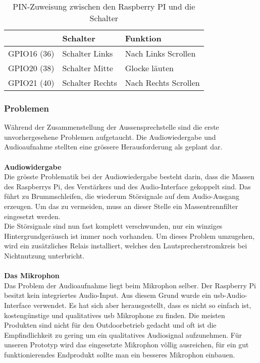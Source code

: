 \begin{table}[]
	\centering
	\label{my-label}
	\begin{tabular}{l|ll}
		\multicolumn{1}{r|}{} \textbf{Pi GPIO (PIN)} & \textbf{Schalter} & \textbf{Funktion} \hspace{60pt}	\\ \hline
		GPIO16 (36)	&	Schalter Links		&	Nach Links Scrollen	\\ \hline
		GPIO20 (38)	&	Schalter Mitte		&	Glocke läuten		\\ \hline
		GPIO21 (40)	&	Schalter Rechts		&	Nach Rechts Scrollen		\\ \hline
	\end{tabular}
	\caption{PIN-Zuweisung zwischen den Raspberry PI und die Schalter}
	\label{tbl:pinroutesdoor}
\end{table}

\subsubsection{Problemen}
Während der Zusammenstellung der Aussensprechstelle sind die erste unvorhergesehene Problemen aufgetaucht. Die Audiowiedergabe und Audioaufnahme stellten eine grössere Herausforderung als geplant dar.
\\
\\
\textbf{Audiowidergabe} 
\\
Die grösste Problematik bei der Audiowiedergabe besteht darin, dass die Massen des Raspberrys Pi, des Verstärkers und des Audio-Interface gekoppelt sind. Das führt zu Brummschleifen, die wiederum Störsignale auf dem Audio-Ausgang erzeugen. Um das zu vermeiden, muss an dieser Stelle ein Massentrennfilter eingesetzt werden.
\\
Die Störsignale sind nun fast komplett verschwunden, nur ein winziges Hintergrundgeräusch ist immer noch vorhanden. Um dieses Problem umzugehen, wird ein zusätzliches Relais installiert, welches den Lautsprecherstromkreis bei Nichtnutzung unterbricht.
\\
\\
\textbf{Das Mikrophon}
\\
Das Problem der Audioaufnahme liegt beim Mikrophon selber. Der Raspberry Pi besitzt kein integriertes Audio-Input. Aus diesem Grund wurde ein \gls{usb}-Audio-Interface verwendet. Es hat sich aber herausgestellt, dass es nicht so einfach ist, kostengünstige und qualitatives \gls{usb} Mikrophone zu finden. Die meisten Produkten sind nicht für den Outdoorbetrieb gedacht und oft ist die Empfindlichkeit zu gering um ein qualitatives Audiosignal aufzunehmen.  Für unseren Prototyp wird das eingesetzte Mikrophon völlig ausreichen, für ein gut funktionierendes Endprodukt sollte man ein besseres Mikrophon einbauen.
\newpage